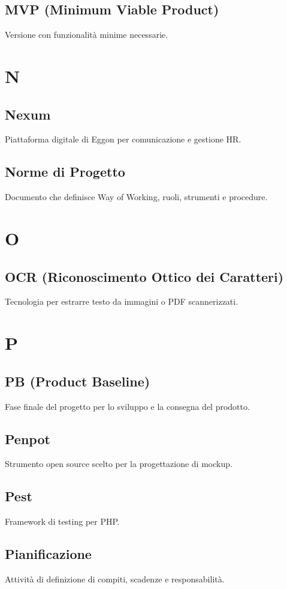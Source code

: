 \documentclass[a4paper,12pt]{article}
\begin{document}
\subsection{MVP (Minimum Viable Product)}
Versione con funzionalità minime necessarie.

\section{N}
\subsection{Nexum}
Piattaforma digitale di Eggon per comunicazione e gestione HR.

\subsection{Norme di Progetto}
Documento che definisce Way of Working, ruoli, strumenti e procedure.

\section{O}
\subsection{OCR (Riconoscimento Ottico dei Caratteri)}
Tecnologia per estrarre testo da immagini o PDF scannerizzati.

\section{P}
\subsection{PB (Product Baseline)}
Fase finale del progetto per lo sviluppo e la consegna del prodotto.

\subsection{Penpot}
Strumento open source scelto per la progettazione di mockup.

\subsection{Pest}
Framework di testing per PHP.

\subsection{Pianificazione}
Attività di definizione di compiti, scadenze e responsabilità.
\end{document}
